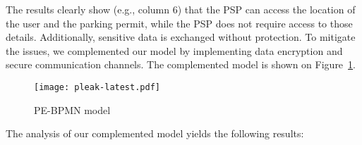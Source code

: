 The results clearly show (e.g., column 6) that the PSP can access the location
of the user and the parking permit, while the PSP does not require access to
those details. Additionally, sensitive data is exchanged without protection. To
mitigate the issues, we complemented our model by implementing data encryption
and secure communication channels. The complemented model is shown on
Figure~\ref{fig:pleak-model}.

\begin{landscape}

\begin{figure}[ht]
\begin{center}
    \texttt{[image: pleak-latest.pdf]}
    \caption{PE-BPMN model}
    \label{fig:pleak-model}
\end{center}
\end{figure}

\end{landscape}

The analysis of our complemented model yields the following results:

